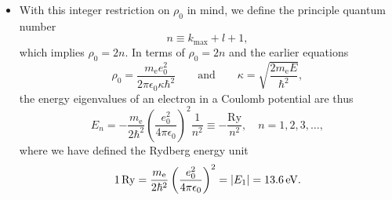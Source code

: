 \documentclass[11pt, a4paper]{article}
\newcommand{\eqtext}[1]{\qquad \text{#1} \qquad}
\begin{document}
\begin{itemize}
	\item With this integer restriction on $ \rho_{0} $ in mind, we define the principle quantum number
	\begin{equation*}
		n \equiv k_{\text{max}} + l + 1,
	\end{equation*}
	which implies $ \rho_{0} = 2n $. In terms of $ \rho_{0} = 2n $ and the earlier equations
	\begin{equation*}
		\rho_{0} = \frac{m_{\text{e}}e_{0}^{2}}{2\pi \epsilon_{0}\kappa \hbar^{2}} \eqtext{and} \kappa = \sqrt{\frac{2m_{\text{e}}E}{\hbar^{2}}},
	\end{equation*}
	the energy eigenvalues of an electron in a Coulomb potential are thus
	\begin{equation*}
		E_{n} = - \frac{m_{\text{e}}}{2\hbar^{2}}\left(\frac{e_{0}^{2}}{4\pi \epsilon_{0}}\right)^{2}\frac{1}{n^{2}} \equiv - \frac{\text{Ry}}{n^{2}}, \quad n = 1, 2, 3, \ldots,
	\end{equation*}
	where we have defined the Rydberg energy unit
	\begin{equation*}
		\SI{1}{Ry} = \frac{m_{\text{e}}}{2\hbar^{2}}\left(\frac{e_{0}^{2}}{4\pi \epsilon_{0}}\right)^{2} = \abs{E_{1}} = \SI{13.6}{\electronvolt}.
	\end{equation*}
\end{itemize}
\end{document}
